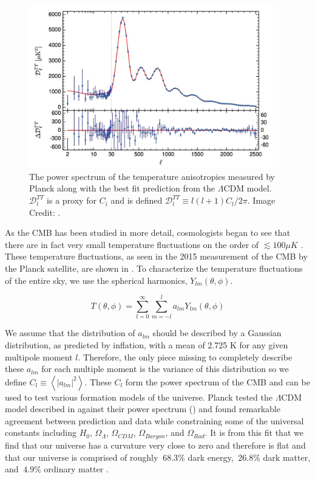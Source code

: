 \begin{figure}[ht]
	\centering
	\includegraphics[width=0.95\textwidth]{planck_2015_power_spectrum}
	\caption{The power spectrum of the temperature anisotropies measured by Planck along with the best fit prediction from the $\Lambda$CDM model.  $\mathcal{D}_l^{TT}$ is a proxy for $C_i$ and is defined $\mathcal{D}_l^{TT} \equiv l(l+1)C_l / 2 \pi$.  Image Credit: .}
	\label{fig:planck_fit}
\end{figure}


As the CMB has been studied in more detail, cosmologists began to see that there are in fact very small temperature fluctuations on the order of ${\lesssim}100 \mu K$ \cite{bennett1996four, komatsu2011seven, Ade2015}.  These temperature fluctuations, as seen in the 2015 measurement of the CMB by the Planck satellite, are shown in .  To characterize the temperature fluctuations of the entire sky, we use the spherical harmonics, $Y_{lm}(\theta, \phi)$.  


\begin{equation}
	T(\theta, \phi) = \sum_{l=0}^{\infty} \sum_{m=-l}^{l} a_{lm} Y_{lm}(\theta, \phi)
\end{equation}

We assume that  the distribution of $a_{lm}$ should be described by a Gaussian distribution, as predicted by inflation, with a mean of 2.725 K for any given multipole moment $l$.  Therefore, the only piece missing to completely describe these $a_{lm}$ for each multiple moment is the variance of  this distribution so we define $C_l \equiv \left<| a_{lm}|^2\right>$.  These $C_l$ form the power spectrum of the CMB and can be used to test various formation models of the universe.  Planck tested the $\Lambda$CDM model described in  against their power spectrum () and found remarkable agreement between prediction and data while constraining some of the universal constants including $H_0$, $\Omega_{\Lambda}$, $\Omega_{CDM}$, $\Omega_{Baryon}$, and $\Omega_{Rad}$.  It is from this fit that we find that our universe has a curvature very close to zero and therefore is flat and that our universe is comprised of roughly  $~68.3\%$ dark energy, $~26.8\%$ dark matter, and $~4.9\%$ ordinary matter \cite{Ade2015}.

